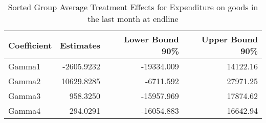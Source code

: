 \begin{table}

\caption{\label{tab:gatesQExpenditure_totDF}Sorted Group Average Treatment Effects for Expenditure on goods in the last month at endline}
\centering
\begin{tabular}[t]{lrrr}
\toprule
Coefficient & Estimates & Lower Bound 90\% & Upper Bound 90\%\\
\midrule
Gamma1 & -2605.9232 & -19334.009 & 14122.16\\
Gamma2 & 10629.8285 & -6711.592 & 27971.25\\
Gamma3 & 958.3250 & -15957.969 & 17874.62\\
Gamma4 & 294.0291 & -16054.883 & 16642.94\\
\bottomrule
\end{tabular}
\end{table}
